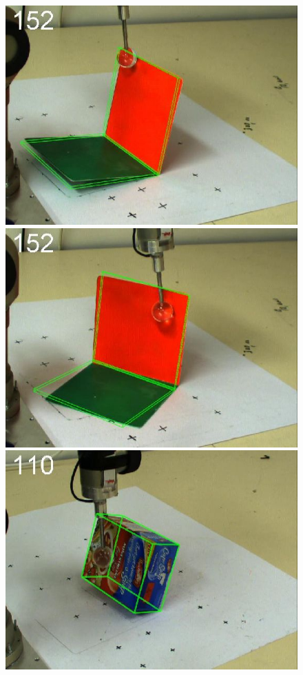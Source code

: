 \begin{figure}[htbp]
{}
\centerline{
\includegraphics[width=\imgAXwid]{images/A1_2exp_667_2}
\includegraphics[width=\imgAXwid]{images/A1_2exp_876_2}
\includegraphics[width=\imgAXwid]{images/A2_2exp_399_2}
}
\end{figure}
